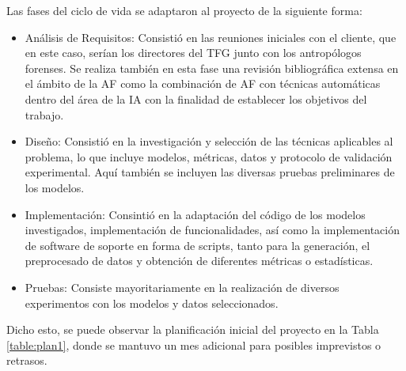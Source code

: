 Las fases del ciclo de vida se adaptaron al proyecto de la siguiente forma:
\begin{itemize}
    \item Análisis de Requisitos: Consistió en las reuniones iniciales con el cliente, que en este caso, serían los directores del TFG junto con los antropólogos forenses. Se realiza también en esta fase una revisión bibliográfica extensa en el ámbito de la AF como la combinación de AF con técnicas automáticas dentro del área de la IA con la finalidad de establecer los objetivos del trabajo.
    \item Diseño: Consistió en la investigación y selección de las técnicas aplicables al problema, lo que incluye modelos, métricas, datos y protocolo de validación experimental. Aquí también se incluyen las diversas pruebas preliminares de los modelos.
    \item Implementación: Consintió en la adaptación del código de los modelos investigados, implementación de funcionalidades, así como la implementación de software de soporte en forma de scripts, tanto para la generación, el preprocesado de datos y obtención de diferentes métricas o estadísticas.
    \item Pruebas: Consiste mayoritariamente en la realización de diversos experimentos con los modelos y datos seleccionados.
\end{itemize}
Dicho esto, se puede observar la planificación inicial del proyecto en la Tabla \ref{table:plan1}, donde se mantuvo un mes adicional para posibles imprevistos o retrasos.

